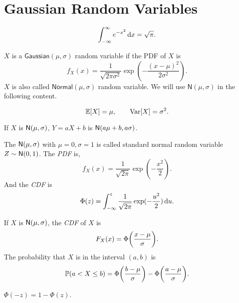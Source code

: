 \section{Gaussian Random Variables}
\begin{theorem}
    \[\int_{-\infty}^{\infty}e^{-x^2}\mathop{}\!\mathrm{d} x=\sqrt{\pi}.\]
\end{theorem}

\begin{definition}
    $X$ is a $\mathsf{Gaussian}(\mu, \sigma)$ random variable if the \textrm{PDF} of $X$ is
    \[f_X(x)=\frac{1}{\sqrt{2\pi\sigma^2}}\exp(-\frac{(x-\mu)^2}{2\sigma^2}).\]
    $X$ is also called $\mathsf{Normal}(\mu,\sigma)$ random variable. We will use $\mathsf{N}(\mu, \sigma)$ in the following content.
\end{definition}

\begin{theorem}
    \[\E{X} = \mu, \qquad \Var[X] = \sigma^2.\]
\end{theorem}

\begin{theorem}
    If $X$ is $\mathsf{N}(\mu,\sigma)$, $Y=aX+b$ is $\mathsf{N}(a\mu+b,a\sigma)$.
\end{theorem}

\begin{theorem}
    The $\mathsf{N}(\mu,\sigma)$ with $\mu=0, \sigma=1$ is called standard normal random variable $Z\sim\mathsf{N}(0,1)$. The \emph{PDF} is,
    \[f_X(x)=\frac{1}{\sqrt{2\pi}}\exp(-\frac{x^2}{2}).\]
    And the \emph{CDF} is
    \[\Phi(z)=\int_{-\infty}^{z}\frac{1}{\sqrt{2\pi}}\exp(-\frac{u^2}{2})\mathop{}\!\mathrm{d} u.\]
\end{theorem}

\begin{theorem}
    If $X$ is $\mathsf{N}(\mu,\sigma)$, the \emph{CDF} of $X$ is
    \[F_X(x)=\Phi\parens*{\frac{x-\mu}{\sigma}}.\]
    The probability that $X$ is in the interval \emph{$(a,b)$} is
    \[\P{a<X\leq b}=\Phi\parens*{\frac{b-\mu}{\sigma}}-\Phi\parens*{\frac{a-\mu}{\sigma}}.\]
\end{theorem}

\begin{theorem}
    $\Phi(-z)=1-\Phi(z)$.
\end{theorem}


